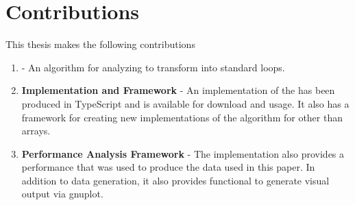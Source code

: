 \section{Contributions}
This thesis makes the following contributions
\begin{enumerate}
  \item \textbf{\Algorithm} - An algorithm for analyzing \javascript to transform \pipelines into standard  loops.
  \item \textbf{\Algorithm Implementation and Framework} - An implementation\cite{fpo16} of the \algorithm has been produced in TypeScript and is available for download and usage. It also has a framework for creating new implementations of the algorithm for \pipelineoperators other than \javascript arrays.
  \item \textbf{Performance Analysis Framework} - The \algorithm implementation\cite{fpo16} also provides a performance \algorithm that was used to produce the data used in this paper.  In addition to data generation, it also provides functional to generate visual output via gnuplot.   
\end{enumerate}